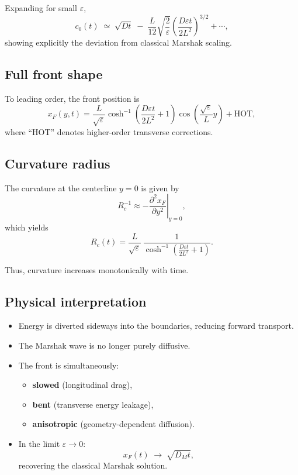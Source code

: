 \documentclass{article}
\begin{document}
Expanding for small $\varepsilon$,
\begin{equation}
c_0(t)
\;\simeq\;
\sqrt{Dt}
\;-\;
\frac{L}{12}\sqrt{\frac{2}{\varepsilon}}
\left(\frac{D\varepsilon t}{2L^2}\right)^{3/2}
+ \cdots,
\end{equation}
showing explicitly the deviation from classical Marshak scaling.

\subsection*{Full front shape}

To leading order, the front position is
\begin{equation}
x_F(y,t)
=
\frac{L}{\sqrt{\varepsilon}}
\cosh^{-1}\!\left( \frac{D\varepsilon t}{2L^2} + 1 \right)
\cos\!\left(\frac{\sqrt{\varepsilon}}{L}y\right)
+ \text{HOT},
\label{eq:front_shape}
\end{equation}
where ``HOT'' denotes higher-order transverse corrections.

\subsection*{Curvature radius}

The curvature at the centerline $y=0$ is given by
\begin{equation}
R_c^{-1}
\approx
-\left.\frac{\partial^2 x_F}{\partial y^2}\right|_{y=0},
\end{equation}
which yields
\begin{equation}
R_c(t)
=
\frac{L}{\sqrt{\varepsilon}}\,
\frac{1}{\cosh^{-1}\!\left( \frac{D\varepsilon t}{2L^2} + 1 \right)}.
\end{equation}

Thus, curvature increases monotonically with time.

\subsection*{Physical interpretation}

\begin{itemize}
\item Energy is diverted sideways into the boundaries, reducing forward transport.
\item The Marshak wave is no longer purely diffusive.
\item The front is simultaneously:
\begin{itemize}
    \item \textbf{slowed} (longitudinal drag),
    \item \textbf{bent} (transverse energy leakage),
    \item \textbf{anisotropic} (geometry-dependent diffusion).
\end{itemize}
\item In the limit $\varepsilon \to 0$:
\[
x_F(t) \;\to\; \sqrt{D_M t},
\]
recovering the classical Marshak solution.
\end{itemize}
\end{document}
